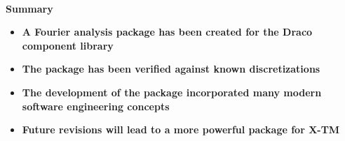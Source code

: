 \baselineskip=0.29in

\newpage

\noindent
\mbox{ }
\vskip0.5in
{\Huge
\begin{center}
{\bf Summary}
\end{center}
\vskip0.5in
\begin{itemize}
\item {\bf A Fourier analysis package has been created for the Draco 
           component library}
\item {\bf The package has been verified against known discretizations} 
\item {\bf The development of the package incorporated many modern
           software engineering concepts}
\item {\bf Future revisions will lead to a  more powerful package for X-TM}
\end{itemize}

\vskip1.0in
}

